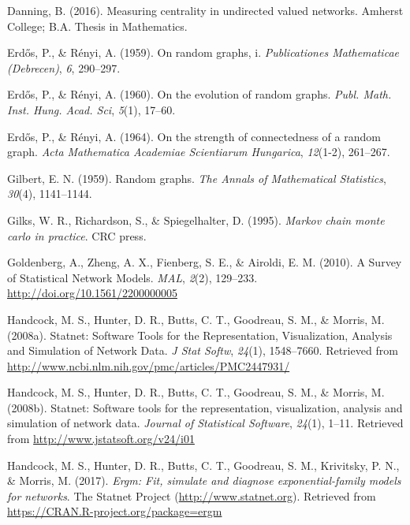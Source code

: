 \documentclass[12pt,twoside]{amherstthesis}
\begin{document}
  \hypertarget{ref-beckydanning}{}
  Danning, B. (2016). Measuring centrality in undirected valued networks.
  Amherst College; B.A. Thesis in Mathematics.
  
  \hypertarget{ref-erdos1959random}{}
  Erd\H{o}s, P., \& Rényi, A. (1959). On random graphs, i.
  \emph{Publicationes Mathematicae (Debrecen)}, \emph{6}, 290--297.
  
  \hypertarget{ref-erdos1960evolution}{}
  Erd\H{o}s, P., \& Rényi, A. (1960). On the evolution of random graphs.
  \emph{Publ. Math. Inst. Hung. Acad. Sci}, \emph{5}(1), 17--60.
  
  \hypertarget{ref-erdHos1964strength}{}
  Erd\H{o}s, P., \& Rényi, A. (1964). On the strength of connectedness of
  a random graph. \emph{Acta Mathematica Academiae Scientiarum Hungarica},
  \emph{12}(1-2), 261--267.
  
  \hypertarget{ref-gilbert1959random}{}
  Gilbert, E. N. (1959). Random graphs. \emph{The Annals of Mathematical
  Statistics}, \emph{30}(4), 1141--1144.
  
  \hypertarget{ref-gilks1995markov}{}
  Gilks, W. R., Richardson, S., \& Spiegelhalter, D. (1995). \emph{Markov
  chain monte carlo in practice}. CRC press.
  
  \hypertarget{ref-goldenberg_survey_2010}{}
  Goldenberg, A., Zheng, A. X., Fienberg, S. E., \& Airoldi, E. M. (2010).
  A Survey of Statistical Network Models. \emph{MAL}, \emph{2}(2),
  129--233. \url{http://doi.org/10.1561/2200000005}
  
  \hypertarget{ref-handcock_statnet:_2008}{}
  Handcock, M. S., Hunter, D. R., Butts, C. T., Goodreau, S. M., \&
  Morris, M. (2008a). Statnet: Software Tools for the Representation,
  Visualization, Analysis and Simulation of Network Data. \emph{J Stat
  Softw}, \emph{24}(1), 1548--7660. Retrieved from
  \url{http://www.ncbi.nlm.nih.gov/pmc/articles/PMC2447931/}
  
  \hypertarget{ref-statnetpackagearticle}{}
  Handcock, M. S., Hunter, D. R., Butts, C. T., Goodreau, S. M., \&
  Morris, M. (2008b). Statnet: Software tools for the representation,
  visualization, analysis and simulation of network data. \emph{Journal of
  Statistical Software}, \emph{24}(1), 1--11. Retrieved from
  \url{http://www.jstatsoft.org/v24/i01}
  
  \hypertarget{ref-ergmpackagemanual}{}
  Handcock, M. S., Hunter, D. R., Butts, C. T., Goodreau, S. M.,
  Krivitsky, P. N., \& Morris, M. (2017). \emph{Ergm: Fit, simulate and
  diagnose exponential-family models for networks}. The Statnet Project
  (\url{http://www.statnet.org}). Retrieved from
  \url{https://CRAN.R-project.org/package=ergm}
  
\end{document}
